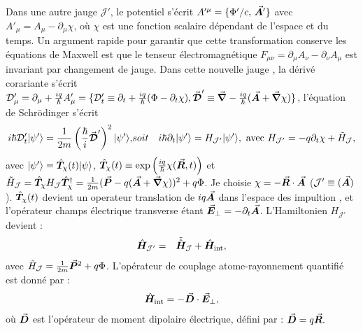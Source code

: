 Dans une autre jauge $\mathcal{J}'$, le potentiel s’écrit $A'^\mu = \{ \Phi'/c,\, \vec{{\bm{A}}}' \}$ avec $ A'_\mu = A_\mu - \partial_\mu \chi$, où $\chi$ est une fonction scalaire dépendant de l’espace et du temps. Un argument rapide pour garantir que cette transformation conserve les équations de Maxwell est que le tenseur électromagnétique
\(
F_{\mu\nu} = \partial_\mu A_\nu - \partial_\nu A_\mu
\)
est invariant par changement de jauge. Dans cette nouvelle jauge , la dérivé corariante s'écrit $\mathcal{D}_\mu' = \partial_\mu + \frac{iq}{\hbar} A_\mu' = \{ \mathcal{D}_t' \equiv \partial_t + \frac{iq}{\hbar} ( \Phi - \partial_t \chi )   , \vec{{\bm{\mathcal{D}}}}' \equiv \vec{{\bm{\nabla}}} - \frac{iq}{\hbar} (\vec{{\bm{A}}} + \vec{{\bm{\nabla}}}\chi)\} $, l’équation de Schrödinger s'écrit
\begin{eqnarray}
	i\hbar \mathcal{D}_t' \vert \psi' \rangle = \frac{1}{2m} \left( \frac{\hbar}{i} \operatorvec{\mathcal{D}}' \right)^2 \vert \psi' \rangle, & soit &  i\hbar \partial_t \vert \psi' \rangle = H_{\mathcal{J}'} \vert \psi' \rangle , ~\mbox{avec}~	H_{\mathcal{J}'} = -q\partial_t \chi + \tilde{H}_{\mathcal{J}},%
\end{eqnarray}
avec $\vert \psi'\rangle = \hat{\bm{T}}_\chi(t) \vert \psi\rangle$, $\hat{\bm{T}}_\chi(t) \equiv \exp\left( \frac{iq}{\hbar} \chi(\vec{{\bm{R}}}, t) \right)$ et $\tilde{H}_{\mathcal{J}} = \hat{\bm{T}}_\chi H_{\mathcal{J}}\hat{\bm{T}}_\chi^\dag = \frac{1}{2m} ( \vec{{\bm{P}}} - q  ( \vec{{\bm{A}}} + \vec{{\bm{\nabla}}}\chi  )  )^2 + q \Phi $. Je choisie $\chi = - \vec{{\bm{R}}}\cdot\vec{{\bm{A}}}$ (\ie $\mathcal{J}' \equiv (\vec{{\bm{A}}})$). $\hat{\bm{T}}_\chi(t)$ devient un operateur translation de $iq \vec{{\bm{A}}}$ dans l’espace des impultion , et l'opérateur champs électrique transverse étant $\vec{{\bm{E}}}_\perp = - \partial_t \vec{{\bm{A}}}$. L'Hamiltonien $H_{\mathcal{J}'}$ devient :
\begin{eqnarray}
	\hat{\bm{H}}_{\mathcal{J}'} & = & 	\tilde{\hat{\bm{H}}}_{\mathcal{J}}	+ \hat{\bm{H}}_{\text{int}},
\end{eqnarray}
avec $\tilde{H}_{\mathcal{J}} = \frac{1}{2m}\vec{{\bm{P}}}^2 +q \Phi$. L’opérateur de couplage atome-rayonnement quantifié est donné par :
\begin{eqnarray}
\hat{\bm{H}}_{\text{int}} = - \vec{{\bm{D}}} \cdot \vec{{\bm{E}}}_\perp,
\end{eqnarray}
où \(\vec{{\bm{D}}}\) est l’opérateur de moment dipolaire électrique, défini par :
\(
\vec{{\bm{D}}} = q \vec{{\bm{R}}}.
\)



